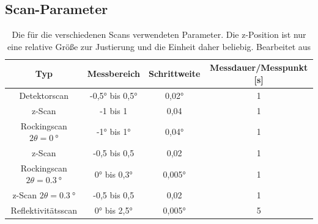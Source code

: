     \subsection{Scan-Parameter}
        \FloatBarrier
        \begin{table}[h]
            \centering
            \caption{Die für die verschiedenen Scans verwendeten Parameter. Die z-Position ist nur eine relative Größe zur Justierung und die Einheit daher beliebig. Bearbeitet aus \cite{tu_dortmund_versuchsanleitung_2022}}
            \label{tab:Scan_parameter}
        
            \begin{tabular}{c c c c}
              \toprule
              {Typ} & {Messbereich} & {Schrittweite} & {Messdauer/Messpunkt [s]}\\ 
              \midrule
               Detektorscan  & -0,5° bis 0,5°  & 0,02°  &   1      \\
               z-Scan  & -1 bis 1  & 0,04  &   1      \\
               Rockingscan $2\theta = \SI{0}{\degree}$  & -1° bis 1°  & 0,04°  &   1      \\
               z-Scan  & -0,5 bis 0,5  & 0,02  &   1      \\
               Rockingscan $2\theta = \SI{0.3}{\degree}$  & 0° bis 0,3°  & 0,005°  &   1      \\
               z-Scan $2\theta = \SI{0.3}{\degree}$  & -0,5 bis 0,5  & 0,02  &   1      \\
               Reflektivitätsscan  & 0° bis 2,5°  & 0,005°  &   5      \\
    
              \bottomrule
            \end{tabular}
        \end{table}
        \FloatBarrier



    
    
        
